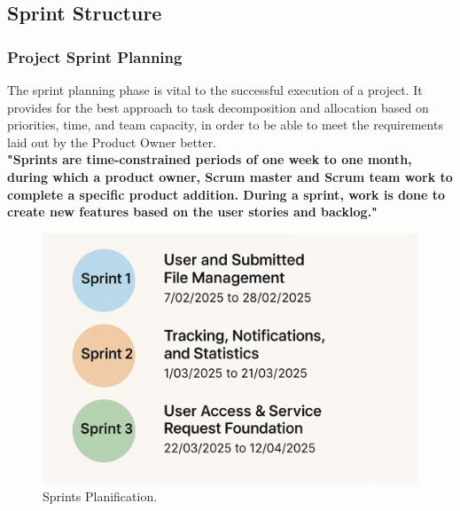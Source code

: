\subsection{Sprint Structure}
\subsubsection{Project Sprint Planning}
The sprint planning phase is vital to the successful execution of a project. It provides for the best approach to task decomposition and allocation based on priorities, time, and team capacity, in order to be able to meet the requirements laid out by the Product Owner better.\\
\textbf{"Sprints are time-constrained periods of one week to one month, during which a product owner, Scrum master and Scrum team work to complete a specific product addition. During a sprint, work is done to create new features based on the user stories and backlog."}\cite{samplewebs5}
\begin{figure}[h]
    \centering
    \includegraphics[width=1\textwidth]{figures/sprints.png}  
    \caption{Sprints Planification.}
\end{figure} \
\clearpage
